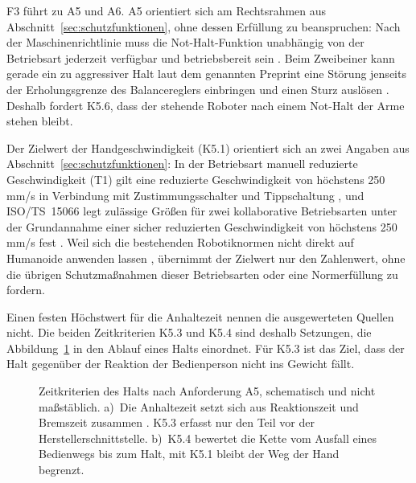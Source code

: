 F3 führt zu A5 und A6.
A5 orientiert sich am Rechtsrahmen aus Abschnitt~\ref{sec:schutzfunktionen}, ohne dessen Erfüllung zu beanspruchen: Nach der Maschinenrichtlinie muss die Not-Halt-Funktion unabhängig von der Betriebsart jederzeit verfügbar und betriebsbereit sein \cite{MRL2006}.
Beim Zweibeiner kann gerade ein zu aggressiver Halt laut dem genannten Preprint eine Störung jenseits der Erholungsgrenze des Balancereglers einbringen und einen Sturz auslösen \cite{Ding2026}. Deshalb fordert K5.6, dass der stehende Roboter nach einem Not-Halt der Arme stehen bleibt.

Der Zielwert der Handgeschwindigkeit (K5.1) orientiert sich an zwei Angaben aus Abschnitt~\ref{sec:schutzfunktionen}: In der Betriebsart manuell reduzierte Geschwindigkeit (T1) gilt eine reduzierte Geschwindigkeit von höchstens 250\,mm/s in Verbindung mit Zustimmungsschalter und Tippschaltung \cite{DGUV2015}, und ISO/TS~15066 legt zulässige Größen für zwei kollaborative Betriebsarten unter der Grundannahme einer sicher reduzierten Geschwindigkeit von höchstens 250\,mm/s fest \cite{Villani2018}.
Weil sich die bestehenden Robotiknormen nicht direkt auf Humanoide anwenden lassen \cite{Prather2025}, übernimmt der Zielwert nur den Zahlenwert, ohne die übrigen Schutzmaßnahmen dieser Betriebsarten oder eine Normerfüllung zu fordern.

Einen festen Höchstwert für die Anhaltezeit nennen die ausgewerteten Quellen nicht. Die beiden Zeitkriterien K5.3 und K5.4 sind deshalb Setzungen, die Abbildung~\ref{fig:schutzzeiten} in den Ablauf eines Halts einordnet.
Für K5.3 ist das Ziel, dass der Halt gegenüber der Reaktion der Bedienperson nicht ins Gewicht fällt. 

\begin{figure}[!htbp]
  \centering
  
  \caption[Zeitkriterien des Halts nach Anforderung A5]{Zeitkriterien des Halts nach Anforderung A5, schematisch und nicht maßstäblich. a)~Die Anhaltezeit setzt sich aus Reaktionszeit und Bremszeit zusammen \cite{DGUV2015}. K5.3 erfasst nur den Teil vor der Herstellerschnittstelle. b)~K5.4 bewertet die Kette vom Ausfall eines Bedienwegs bis zum Halt, mit K5.1 bleibt der Weg der Hand begrenzt.}
  \label{fig:schutzzeiten}
\end{figure}

